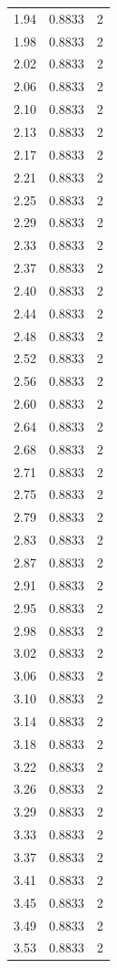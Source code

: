 \begin{longtable}{lrr}
  1.94 & 0.8833 & 2 \\
  1.98 & 0.8833 & 2 \\
  2.02 & 0.8833 & 2 \\
  2.06 & 0.8833 & 2 \\
  2.10 & 0.8833 & 2 \\
  2.13 & 0.8833 & 2 \\
  2.17 & 0.8833 & 2 \\
  2.21 & 0.8833 & 2 \\
  2.25 & 0.8833 & 2 \\
  2.29 & 0.8833 & 2 \\
  2.33 & 0.8833 & 2 \\
  2.37 & 0.8833 & 2 \\
  2.40 & 0.8833 & 2 \\
  2.44 & 0.8833 & 2 \\
  2.48 & 0.8833 & 2 \\
  2.52 & 0.8833 & 2 \\
  2.56 & 0.8833 & 2 \\
  2.60 & 0.8833 & 2 \\
  2.64 & 0.8833 & 2 \\
  2.68 & 0.8833 & 2 \\
  2.71 & 0.8833 & 2 \\
  2.75 & 0.8833 & 2 \\
  2.79 & 0.8833 & 2 \\
  2.83 & 0.8833 & 2 \\
  2.87 & 0.8833 & 2 \\
  2.91 & 0.8833 & 2 \\
  2.95 & 0.8833 & 2 \\
  2.98 & 0.8833 & 2 \\
  3.02 & 0.8833 & 2 \\
  3.06 & 0.8833 & 2 \\
  3.10 & 0.8833 & 2 \\
  3.14 & 0.8833 & 2 \\
  3.18 & 0.8833 & 2 \\
  3.22 & 0.8833 & 2 \\
  3.26 & 0.8833 & 2 \\
  3.29 & 0.8833 & 2 \\
  3.33 & 0.8833 & 2 \\
  3.37 & 0.8833 & 2 \\
  3.41 & 0.8833 & 2 \\
  3.45 & 0.8833 & 2 \\
  3.49 & 0.8833 & 2 \\
  3.53 & 0.8833 & 2 \\

\end{longtable}
